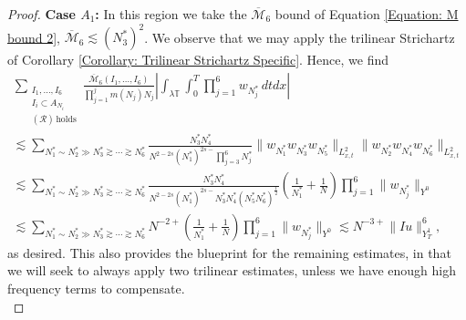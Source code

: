 \documentclass[10pt,a4paper]{amsart}
\begin{document}
\begin{proof}
    \textbf{Case $A_1$: } In this region we take the $\overline{\mathcal{M}}_6$ bound of Equation \eqref{Equation: M bound 2}, $\overline{\mathcal{M}}_6\lesssim (N_3^*)^2$. We observe that we may apply the trilinear Strichartz of Corollary \ref{Corollary: Trilinear Strichartz Specific}. Hence, we find
    \begin{multline*}
        \sum_{\substack{I_1,\dots, I_6\\I_i\subset A_{N_i}\\(\mathcal{R})\,\mathrm{ holds}}}\frac{\overline{\mathcal{M}}_6(I_1,\dots, I_6)}{\prod_{j=1}^jm(N_j)N_j}\left|\int_{\lambda\mathbb{T}}\int_0^T\prod_{j=1}^6w_{N_j^*}\,dtdx\right|\\
        \lesssim \sum_{N_1^*\sim N_2^*\gg N_3^*\gtrsim\cdots\gtrsim N_6^*}\frac{N_3^*N_4^*}{N^{2-2s}(N_1^*)^{2s-}\prod_{j=3}^6N_j^*}\|w_{N_1^*}w_{N_3^*}w_{N_5^*}\|_{L^2_{x,t}}\|w_{N_2^*}w_{N_4^*}w_{N_6^*}\|_{L^2_{x,t}}\\
        \lesssim \sum_{N_1^*\sim N_2^*\gg N_3^*\gtrsim\cdots\gtrsim N_6^*}\frac{N_3^*N_4^*}{N^{2-2s}(N_1^*)^{2s-}N_3^*N_4^*(N_5^*N_6^*)^\frac{1}{2}}\left(\frac{1}{N_1^*} + \frac{1}{N}\right)\prod_{j=1}^6\|w_{N_j^*}\|_{Y^0}\\
        \lesssim \sum_{N_1^*\sim N_2^*\gg N_3^*\gtrsim\cdots\gtrsim N_6^*}N^{-2+}\left(\frac{1}{N_1^*} + \frac{1}{N}\right)\prod_{j=1}^6\|w_{N_j^*}\|_{Y^0}\lesssim N^{-3+}\|Iu\|_{Y^1_T}^6,
    \end{multline*}
    as desired. This also provides the blueprint for the remaining estimates, in that we will seek to always apply two trilinear estimates, unless we have enough high frequency terms to compensate.\\


\end{proof}
\end{document}
